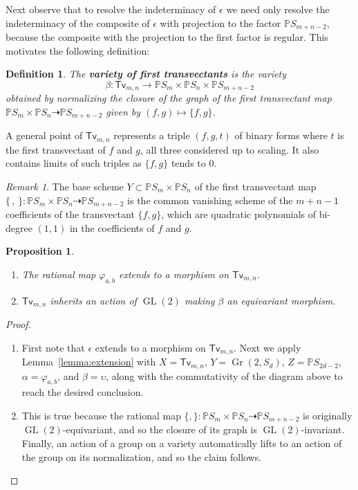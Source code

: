 \documentclass[12pt]{article}
\theoremstyle{plain}
\newtheorem{proposition}[theorem]{Proposition}
\newtheorem{definition}[theorem]{Definition}
\theoremstyle{remark}
\newtheorem{remark}[theorem]{Remark}
\renewcommand{\P}{\mathbb{P}}
\newcommand{\Gr}{\operatorname{Gr}}
\newcommand{\GL}{\operatorname{GL}}
\newcommand{\transvectant}{\mathsf{Tv}}
\begin{document}
Next observe that to resolve the indeterminacy of $\epsilon$ we need only resolve the indeterminacy of the composite of $\epsilon$ with projection to the factor $\P S_{m+n-2}$, because the composite with the projection to the first factor is regular.  This motivates the following definition:


\begin{definition}
    \label{definition:transvectantvariety}
    The \textbf{variety of first transvectants} is the variety
    \[\beta: \transvectant_{m,n} \to \P S_{m} \times \P S_{n} \times \P S_{m+n-2}\] obtained by normalizing the closure of the graph of the first transvectant map $\P S_{m} \times \P S_{n} \dashrightarrow \P S_{m+n-2}$ given by $(f,g) \mapsto \{f,g\}$.
\end{definition}

A general point of $\transvectant_{m,n}$ represents a triple $(f,g,t)$ of binary forms where $t$ is the first transvectant of $f$ and $g$, all three considered up to scaling.  It also contains limits of such triples as $\{f,g\}$ tends to $0$.

\begin{remark}
    \label{remark:schemestructure}
    The base scheme $Y \subset \P S_{m} \times \P S_{n}$ of the first transvectant map $\{\,,\,\}: \P S_{m} \times \P S_{n} \dashrightarrow \P S_{m+n-2}$ is the common vanishing scheme of the $m+n-1$ coefficients of the transvectant $\{f,g\}$, which are quadratic polynomials of bi-degree $(1,1)$ in the coefficients of $f$ and $g$.
\end{remark}


\begin{proposition}
    \label{proposition:clebsch-resolved}
    \begin{enumerate}
        \item The rational map $\varphi_{a,b}$ extends to a morphism on $\transvectant_{m,n}$.
        \item $\transvectant_{m,n}$ inherits an action of $\GL(2)$ making $\beta$ an equivariant morphism.
    \end{enumerate}
\end{proposition}

\begin{proof}
    \label{proof:clebsch-resolved}
    \begin{enumerate}
        \item First note that $\epsilon$ extends to a morphism on $\transvectant_{m,n}$. Next we apply Lemma~\ref{lemma:extension} with $X = \transvectant_{m,n}$, $Y = \Gr(2,S_{d})$, $Z = \P S_{2d-2}$, $\alpha = \varphi_{a,b}$, and $\beta = \upsilon$, along with the commutativity of the diagram above to reach the desired conclusion.

        \item This is true because the rational map $\{,\}:\P S_{m} \times \P S_{n} \dashrightarrow \P S_{m+n-2}$ is originally $\GL(2)$-equivariant, and so the closure of its graph is $\GL(2)$-invariant.  Finally, an action of a group on a variety automatically lifts to an action of the group on its normalization, and so the claim follows.
    \end{enumerate}
\end{proof}
\end{document}

